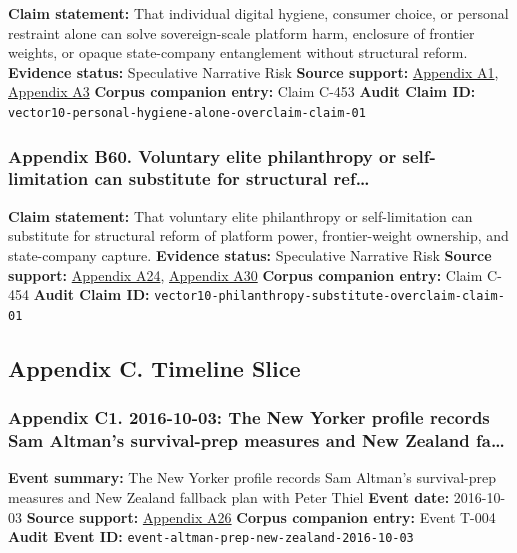 \documentclass[
  american,
  11pt,
  letterpaper,
]{article}
\begin{document}
\textbf{Claim statement:} That individual digital hygiene, consumer
choice, or personal restraint alone can solve sovereign-scale platform
harm, enclosure of frontier weights, or opaque state-company
entanglement without structural reform. \textbf{Evidence status:}
Speculative Narrative Risk \textbf{Source support:}
\hyperref[ch-10-appendix-a1-artificial-intelligence-and-the-future-of-teaching-and-learning-insights-and-recommendations]{Appendix
A1},
\hyperref[ch-10-appendix-a3-interactions-between-artificial-intelligence-and-digital-public-infrastructure-concepts-benefits-and-challenges]{Appendix
A3} \textbf{Corpus companion entry:} Claim C-453 \textbf{Audit Claim
ID:} \texttt{vector10-personal-hygiene-alone-overclaim-claim-01}

\subsubsection{Appendix B60. Voluntary elite philanthropy or
self-limitation can substitute for structural
ref\ldots{}}\label{ch-10-appendix-b60-voluntary-elite-philanthropy-or-self-limitation-can-substitute-for-structural-ref}

\textbf{Claim statement:} That voluntary elite philanthropy or
self-limitation can substitute for structural reform of platform power,
frontier-weight ownership, and state-company capture. \textbf{Evidence
status:} Speculative Narrative Risk \textbf{Source support:}
\hyperref[ch-10-appendix-a24-the-adolescence-of-technology]{Appendix
A24},
\hyperref[ch-10-appendix-a30-encyclical-letter-of-his-holiness-leo-xiv-magnifica-humanitas]{Appendix
A30} \textbf{Corpus companion entry:} Claim C-454 \textbf{Audit Claim
ID:} \texttt{vector10-philanthropy-substitute-overclaim-claim-01}

\subsection{Appendix C. Timeline
Slice}\label{appendix-c.-timeline-slice-10}

\subsubsection{Appendix C1. 2016-10-03: The New Yorker profile records
Sam Altman's survival-prep measures and New Zealand
fa\ldots{}}\label{ch-10-appendix-c1-2016-10-03-the-new-yorker-profile-records-sam-altman-s-survival-prep-measures-and-new-zealand-fallback-plan-with-peter-thiel}

\textbf{Event summary:} The New Yorker profile records Sam Altman's
survival-prep measures and New Zealand fallback plan with Peter Thiel
\textbf{Event date:} 2016-10-03 \textbf{Source support:}
\hyperref[ch-10-appendix-a26-sam-altman-s-manifest-destiny]{Appendix
A26} \textbf{Corpus companion entry:} Event T-004 \textbf{Audit Event
ID:} \texttt{event-altman-prep-new-zealand-2016-10-03}
\end{document}
